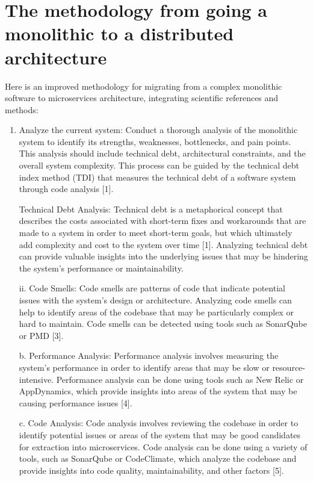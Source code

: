 \section{The methodology from going a monolithic to a distributed architecture}

Here is an improved methodology for migrating from a complex monolithic software to microservices architecture, integrating scientific references and methods:

\begin{enumerate}
    
\item Analyze the current system: Conduct a thorough analysis of the monolithic system to identify its strengths, weaknesses, bottlenecks, and pain points. This analysis should include technical debt, architectural constraints, and the overall system complexity. This process can be guided by the technical debt index method (TDI) that measures the technical debt of a software system through code analysis [1].

Technical Debt Analysis: Technical debt is a metaphorical concept that describes the costs associated with short-term fixes and workarounds that are made to a system in order to meet short-term goals, but which ultimately add complexity and cost to the system over time [1]. Analyzing technical debt can provide valuable insights into the underlying issues that may be hindering the system's performance or maintainability.

ii. Code Smells: Code smells are patterns of code that indicate potential issues with the system's design or architecture. Analyzing code smells can help to identify areas of the codebase that may be particularly complex or hard to maintain. Code smells can be detected using tools such as SonarQube or PMD [3].

b. Performance Analysis: Performance analysis involves measuring the system's performance in order to identify areas that may be slow or resource-intensive. Performance analysis can be done using tools such as New Relic or AppDynamics, which provide insights into areas of the system that may be causing performance issues [4].

c. Code Analysis: Code analysis involves reviewing the codebase in order to identify potential issues or areas of the system that may be good candidates for extraction into microservices. Code analysis can be done using a variety of tools, such as SonarQube or CodeClimate, which analyze the codebase and provide insights into code quality, maintainability, and other factors [5].


\end{enumerate}
